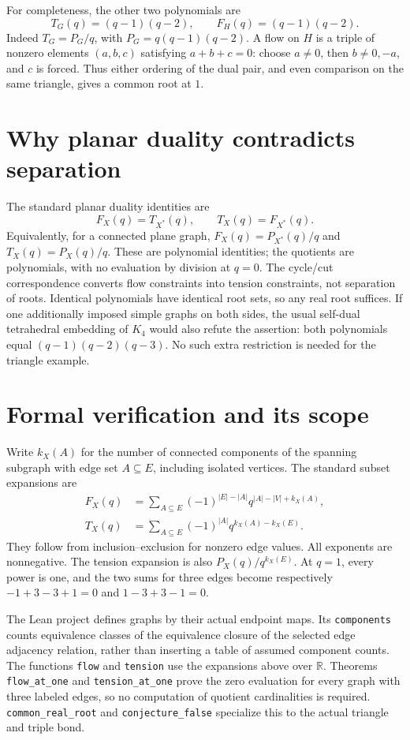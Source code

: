 \documentclass[11pt]{article}
\begin{document}
For completeness, the other two polynomials are
\[
 T_G(q)=(q-1)(q-2),\qquad F_H(q)=(q-1)(q-2).
\]
Indeed $T_G=P_G/q$, with $P_G=q(q-1)(q-2)$. A flow on $H$ is a triple
of nonzero elements $(a,b,c)$ satisfying $a+b+c=0$: choose $a\ne0$,
then $b\ne0,-a$, and $c$ is forced. Thus either ordering of the dual pair,
and even comparison on the same triangle, gives a common root at $1$.

\section{Why planar duality contradicts separation}
The standard planar duality identities are
\[
 F_X(q)=T_{X^*}(q),\qquad T_X(q)=F_{X^*}(q).
\]
Equivalently, for a connected plane graph,
$F_X(q)=P_{X^*}(q)/q$ and $T_X(q)=P_X(q)/q$.
These are polynomial identities; the quotients are polynomials, with
no evaluation by division at $q=0$. The cycle/cut correspondence converts
flow constraints into tension constraints, not separation of roots.
Identical polynomials have identical root sets, so any real root suffices.
If one additionally imposed simple graphs on both sides, the usual
self-dual tetrahedral embedding of $K_4$ would also refute the assertion:
both polynomials equal $(q-1)(q-2)(q-3)$. No such extra restriction is
needed for the triangle example.

\section{Formal verification and its scope}
Write $k_X(A)$ for the number of connected components of the spanning
subgraph with edge set $A\subseteq E$, including isolated vertices.
The standard subset expansions are
\begin{align*}
F_X(q)&=\sum_{A\subseteq E}(-1)^{|E|-|A|}
                    q^{|A|-|V|+k_X(A)},\\
T_X(q)&=\sum_{A\subseteq E}(-1)^{|A|}
                    q^{k_X(A)-k_X(E)}.
\end{align*}
They follow from inclusion--exclusion for nonzero edge values.
All exponents are nonnegative. The tension expansion is also
$P_X(q)/q^{k_X(E)}$. At $q=1$, every power is one, and the two sums
for three edges become respectively $-1+3-3+1=0$ and $1-3+3-1=0$.

The Lean project defines graphs by their actual endpoint maps. Its
\texttt{components} counts equivalence classes of the equivalence closure
of the selected edge adjacency relation, rather than inserting a table
of assumed component counts. The functions \texttt{flow} and
\texttt{tension} use the expansions above over $\mathbb R$. Theorems
\texttt{flow\_at\_one} and \texttt{tension\_at\_one} prove the zero
evaluation for every graph with three labeled edges, so no computation
of quotient cardinalities is required. \texttt{common\_real\_root}
and \texttt{conjecture\_false} specialize this to the actual triangle
and triple bond.
\end{document}
